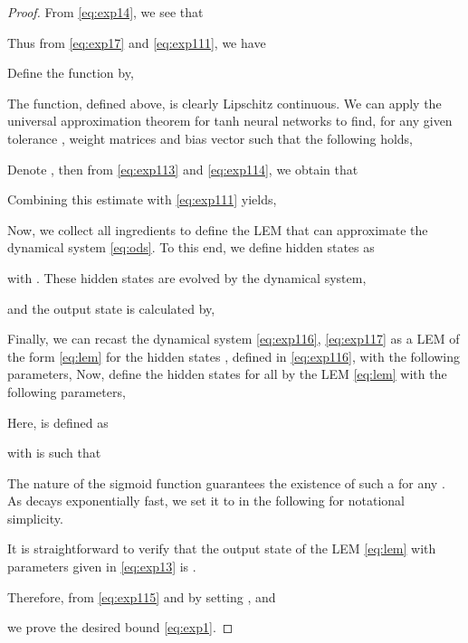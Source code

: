 \documentclass{article} \usepackage{iclr2022_conference,times}
\begin{document}
\begin{proof}
From \eqref{eq:exp14}, we see that


Thus from \eqref{eq:exp17} and \eqref{eq:exp111}, we have

Define the function  by,

The function, defined above, is clearly Lipschitz continuous. We can apply the universal approximation theorem for tanh neural networks to find, for any given tolerance , weight matrices  and bias vector  such that the following holds,

Denote , then from \eqref{eq:exp113} and \eqref{eq:exp114}, we obtain that

Combining this estimate with \eqref{eq:exp111} yields,


Now, we collect all ingredients to define the LEM that can approximate the dynamical system \eqref{eq:ods}. To this end, we define hidden states  as 

with . These hidden states are evolved by the dynamical system,

and the output state is calculated by, 


Finally, we can recast the dynamical system \eqref{eq:exp116}, \eqref{eq:exp117} as a LEM of the form \eqref{eq:lem} for the hidden states , defined in \eqref{eq:exp116}, with the following parameters,
Now, define the hidden states  for all  by the LEM \eqref{eq:lem} with the following parameters, 

Here,  is defined as 

with  is such that 

The nature of the sigmoid function guarantees the existence of such a  for any . As  decays exponentially fast, we set it to  in the following for notational simplicity. 

It is straightforward to verify that the output state of the LEM \eqref{eq:lem} with parameters given in \eqref{eq:exp13} is . 

Therefore, from \eqref{eq:exp115} and by setting ,  and

we prove the desired bound \eqref{eq:exp1}. 




\end{proof}
\end{document}
